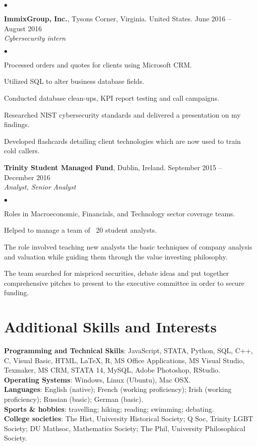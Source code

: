 \documentclass[margin,line]{res}
\newenvironment{list2}{
  \begin{list}{$\bullet$}{%
      \setlength{\itemsep}{0in}
      \setlength{\parsep}{0in} \setlength{\parskip}{0in}
      \setlength{\topsep}{0in} \setlength{\partopsep}{0in}
      \setlength{\leftmargin}{0.2in}}}{\end{list}}
\begin{document}
\begin{resume}
\begin{list2}
\end{list2}
{\bf ImmixGroup, Inc.}, Tysons Corner, Virginia. United States. \hfill{June 2016 -- August 2016}\\
{\em Cybersecurity intern}
\begin{list2} %
\item Processed orders and quotes for clients using Microsoft CRM.
\item Utilized SQL to alter business database fields.
\item Conducted database clean-ups, KPI report testing and call campaigns.
\item Researched NIST cybersecurity standards and delivered a presentation on my findings.
\item Developed flashcards detailing client technologies which are now used to train cold callers.
 \\
\end{list2}

{\bf Trinity Student Managed Fund}, Dublin, Ireland. \hfill{September 2015 -- December 2016}\\
{\em Analyst, Senior Analyst}
\begin{list2} %
\item Roles in Macroeconomic, Financials, and Technology sector coverage teams.
\item Helped to manage a team of ~20 student analysts.
\item The role involved teaching new analysts the basic techniques of company analysis and valuation while guiding them through the value investing philosophy.
\item The team searched for mispriced securities, debate ideas and put together comprehensive pitches to present to the executive committee in order to secure funding.
 \\
\end{list2}

\section{\sc Additional Skills and Interests}
{\bf Programming and Technical Skills}:  JavaScript, STATA, Python, SQL, C++, C, Visual Basic, HTML, LaTeX, R, MS Office Applications, MS Visual Studio, Texmaker, MS CRM, STATA 14, MySQL, Adobe Photoshop, RStudio. \\
{\bf Operating Systems}: Windows, Linux (Ubuntu), Mac OSX.\\
{\bf Languages}: English (native); French (working proficiency); Irish (working proficiency); Russian (basic); German (basic).\\
{\bf Sports & hobbies}: travelling; hiking; reading; swimming; debating.\\
{\bf College societies}: The Hist, University Historical Society; Q Soc, Trinity LGBT Society; DU Mathsoc, Mathematics Society; The Phil, University Philosophical Society.\\

\end{resume}
\end{document}
